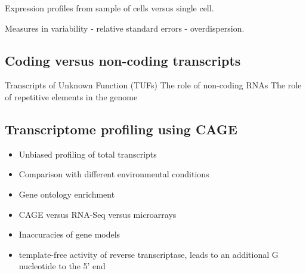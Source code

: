 Expression profiles from sample of cells versus single cell.

Measures in variability - relative standard errors - overdispersion.

\subsection{Coding versus non-coding transcripts}

Transcripts of Unknown Function (TUFs)
The role of non-coding RNAs
The role of repetitive elements in the genome

\subsection{Transcriptome profiling using CAGE}

\begin{itemize}
   \item Unbiased profiling of total transcripts
   \item Comparison with different environmental conditions
   \item Gene ontology enrichment
   \item CAGE versus RNA-Seq versus microarrays\cite{pmid24676093}
   \item Inaccuracies of gene models
   \item template-free activity of reverse transcriptase, leads to an additional G nucleotide to the 5' end
\end{itemize}
